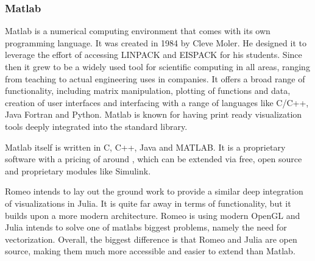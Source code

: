 \subsubsection{Matlab}

\ac{Matlab} is a numerical computing environment that comes with its own programming language.
It was created in 1984 by Cleve Moler. He designed it to leverage the effort of accessing LINPACK and EISPACK for his students.
Since then it grew to be a widely used tool for scientific computing in all areas, ranging from teaching to actual engineering uses in companies.
It offers a broad range of functionality, including matrix manipulation, plotting of functions and data, creation of user interfaces and interfacing with a range of languages like C/C++, Java Fortran and Python. 
Matlab is known for having print ready visualization tools deeply integrated into the standard library.

\ac{Matlab} itself is written in C, C++, Java and MATLAB.
It is a proprietary software with a pricing of around \cite{MatlabPricing}, which can be extended via free, open source and proprietary modules like Simulink.

Romeo intends to lay out the ground work to provide a similar deep integration of visualizations in Julia. 
It is quite far away in terms of functionality, but it builds upon a more modern architecture.
Romeo is using modern OpenGL and Julia intends to solve one of matlabs biggest problems, namely the need for vectorization.
Overall, the biggest difference is that Romeo and Julia are open source, making them much more accessible and easier to extend than Matlab.


